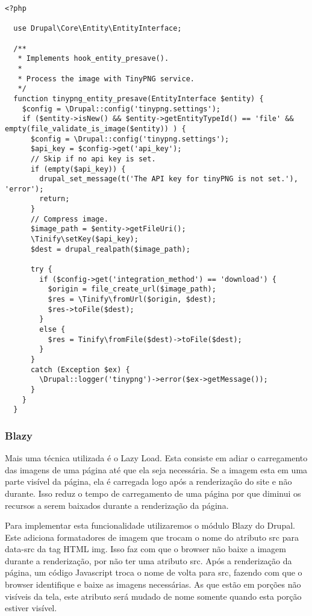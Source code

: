 \lstset{language=PHP}
\begin{lstlisting}[frame=single]
  <?php

  use Drupal\Core\Entity\EntityInterface;

  /**
   * Implements hook_entity_presave().
   *
   * Process the image with TinyPNG service.
   */
  function tinypng_entity_presave(EntityInterface $entity) {
    $config = \Drupal::config('tinypng.settings');
    if ($entity->isNew() && $entity->getEntityTypeId() == 'file' && empty(file_validate_is_image($entity)) ) {
      $config = \Drupal::config('tinypng.settings');
      $api_key = $config->get('api_key');
      // Skip if no api key is set.
      if (empty($api_key)) {
        drupal_set_message(t('The API key for tinyPNG is not set.'), 'error');
        return;
      }
      // Compress image.
      $image_path = $entity->getFileUri();
      \Tinify\setKey($api_key);
      $dest = drupal_realpath($image_path);

      try {
        if ($config->get('integration_method') == 'download') {
          $origin = file_create_url($image_path);
          $res = \Tinify\fromUrl($origin, $dest);
          $res->toFile($dest);
        }
        else {
          $res = Tinify\fromFile($dest)->toFile($dest);
        }
      }
      catch (Exception $ex) {
        \Drupal::logger('tinypng')->error($ex->getMessage());
      }
    }
  }
\end{lstlisting}

\subsubsection{Blazy}
Mais uma técnica utilizada é o Lazy Load. Esta consiste em adiar o carregamento das imagens de uma página até que ela seja necessária. Se a imagem esta em uma parte visível da página, ela é carregada logo após a renderização do site e não durante. Isso reduz o tempo de carregamento de uma página por que diminui os recursos a serem baixados durante a renderização da página.

Para implementar esta funcionalidade utilizaremos o módulo Blazy do Drupal. Este adiciona formatadores de imagem que trocam o nome do atributo src para data-src da tag HTML img. Isso faz com que o browser não baixe a imagem durante a renderização, por não ter uma atributo src. Após a renderização da página, um código Javascript troca o nome de volta para src, fazendo com que o browser identifique e baixe as imagens necessárias. As que estão em porções não visíveis da tela, este atributo será mudado de nome somente quando esta porção estiver visível.


